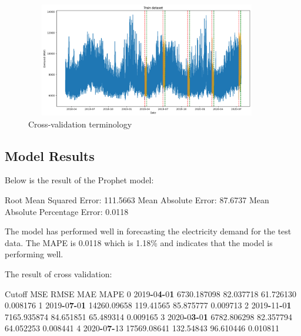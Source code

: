 \documentclass[mstat,12pt]{unswthesis}
\newenvironment{Shaded}{\begin{snugshade}}{\end{snugshade}}
\newcommand{\DecValTok}[1]{\textcolor[rgb]{0.00,0.00,0.81}{#1}}
\newcommand{\ErrorTok}[1]{\textcolor[rgb]{0.64,0.00,0.00}{\textbf{#1}}}
\newcommand{\FloatTok}[1]{\textcolor[rgb]{0.00,0.00,0.81}{#1}}
\newcommand{\NormalTok}[1]{#1}
\newcommand{\OperatorTok}[1]{\textcolor[rgb]{0.81,0.36,0.00}{\textbf{#1}}}
\begin{document}
\begin{figure}[H]
\centering
\includegraphics[width=0.95\textwidth, height=5cm]{cross_validation_output.png}
\caption{Cross-validation terminology}\label{cross_validation_output}
\end{figure}

\subsection{Model Results}\label{model-results-1}

Below is the result of the Prophet model:

\begin{Shaded}
\begin{Highlighting}[]
\NormalTok{Root Mean Squared Error: }\FloatTok{111.5663}
\NormalTok{Mean Absolute Error: }\FloatTok{87.6737}
\NormalTok{Mean Absolute Percentage Error: }\FloatTok{0.0118}
\end{Highlighting}
\end{Shaded}

The model has performed well in forecasting the electricity demand for
the test data. The MAPE is 0.0118 which is 1.18\% and indicates that the
model is performing well.

The result of cross validation:

\begin{Shaded}
\begin{Highlighting}[]
\NormalTok{    Cutoff      MSE           RMSE          MAE         MAPE}
\DecValTok{0}   \DecValTok{2019}\OperatorTok{{-}}\DecValTok{0}\ErrorTok{4}\OperatorTok{{-}}\DecValTok{0}\ErrorTok{1}  \FloatTok{6730.187098}   \FloatTok{82.037718}     \FloatTok{61.726130}   \FloatTok{0.008176}
\DecValTok{1}   \DecValTok{2019}\OperatorTok{{-}}\DecValTok{0}\ErrorTok{7}\OperatorTok{{-}}\DecValTok{0}\ErrorTok{1}  \FloatTok{14260.09658}   \FloatTok{119.41565}     \FloatTok{85.875777}   \FloatTok{0.009713}
\DecValTok{2}   \DecValTok{2019}\OperatorTok{{-}}\DecValTok{11}\OperatorTok{{-}}\DecValTok{0}\ErrorTok{1}  \FloatTok{7165.935874}   \FloatTok{84.651851}     \FloatTok{65.489314}   \FloatTok{0.009165}
\DecValTok{3}   \DecValTok{2020}\OperatorTok{{-}}\DecValTok{0}\ErrorTok{3}\OperatorTok{{-}}\DecValTok{0}\ErrorTok{1}  \FloatTok{6782.806298}   \FloatTok{82.357794}     \FloatTok{64.052253}   \FloatTok{0.008441}
\DecValTok{4}   \DecValTok{2020}\OperatorTok{{-}}\DecValTok{0}\ErrorTok{7}\OperatorTok{{-}}\DecValTok{13}  \FloatTok{17569.08641}   \FloatTok{132.54843}     \FloatTok{96.610446}   \FloatTok{0.010811}
\end{Highlighting}
\end{Shaded}
\end{document}
